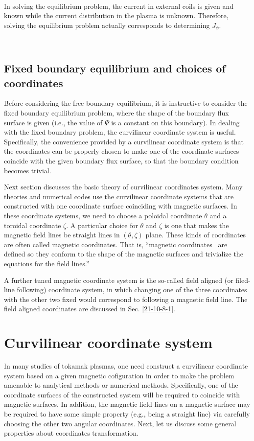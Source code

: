 \documentclass{llncs}
\begin{document}
\

In solving the equilibrium problem, the current in external coils is given
and known while the current distribution in the plasma is unknown. Therefore,
solving the equilibrium problem actually corresponds to determining
$J_{\phi}$.

\

\subsection{Fixed boundary equilibrium and choices of coordinates}

Before considering the free boundary equilibrium, it is instructive to
consider the fixed boundary equilibrium problem, where the shape of the
boundary flux surface is given (i.e., the value of $\Psi$ is a constant on
this boundary). In dealing with the fixed boundary problem, the curvilinear
coordinate system is useful. Specifically, the convenience provided by a
curvilinear coordinate system is that the coordinates can be properly chosen
to make one of the coordinate surfaces coincide with the given boundary flux
surface, so that the boundary condition becomes trivial.

Next section discusses the basic theory of curvilinear coordinates
system{\cite{boozer2005}}. Many theories and numerical codes use the
curvilinear coordinate systems that are constructed with one coordinate
surface coinciding with magnetic surfaces. In these coordinate systems, we
need to choose a poloidal coordinate $\theta$ and a toroidal coordinate
$\zeta$. A particular choice for $\theta$ and $\zeta$ is one that makes the
magnetic field lines be straight lines in $(\theta, \zeta)$ plane. These kinds
of coordinates are often called magnetic coordinates. That is, ``magnetic
coordinates \ are defined so they conform to the shape of the magnetic
surfaces and trivialize the equations for the field lines.''

A further tuned magnetic coordinate system is the so-called field aligned (or
filed-line following) coordinate system, in which changing one of the three
coordinates with the other two fixed would correspond to following a magnetic
field line. The field aligned coordinates are discussed in Sec.
\ref{21-10-8-1}.

\section{Curvilinear coordinate system}

In many studies of tokamak plasmas, one need construct a curvilinear
coordinate system based on a given magnetic cofiguration in order to make the
problem amenable to analytical methods or numerical methods. Specifically, one
of the coordinate surfaces of the constructed system will be required to
coincide with magnetic surfaces. In addition, the magnetic field lines on a
magnetic surface may be required to have some simple property (e.g., being a
straight line) via carefully choosing the other two angular coordinates. Next,
let us discuss some general properties about coordinates transformation.
\end{document}

